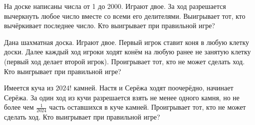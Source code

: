 \documentclass{article}
\begin{document}
\begin{enumerate_boxed}
        \item На доске написаны числа от 1 до 2000.
        Играют двое.
        За ход разрешается вычеркнуть любое число вместе со всеми его делителями.
        Выигрывает тот, кто вычёркивает последнее число.
        Кто выигрывает при правильной игре?

        \item Дана шахматная доска.
        Играют двое.
        Первый игрок ставит коня в любую клетку доски.
        Далее каждый ход игроки ходят конём на любую ранее не занятую клетку (первый ход делает второй игрок).
        Проигрывает тот, кто не может сделать ход.
        Кто выигрывает при правильной игре?

        \item Имеется куча из $2024!$ камней.
        Настя и Серёжа ходят поочерёдно, начинает Серёжа.
        За один ход из кучи разрешается взять не менее одного камня, но не более чем $\frac{1}{2024}$ часть оставшихся в куче камней.
        Проигрывает тот, кто не может сделать ход.
        Кто выигрывает при правильной игре?


    \end{enumerate_boxed}
\end{document}
